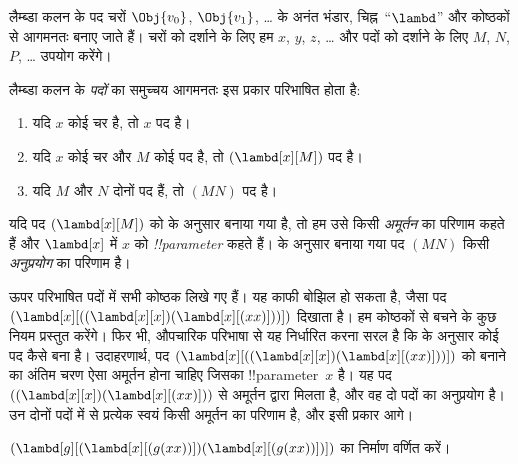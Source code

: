 \documentclass[../../../include/open-logic-section]{subfiles}
\begin{document}

लैम्ब्डा कलन के पद चरों $\Obj{v_0}$, $\Obj{v_1}$, \dots{} के अनंत भंडार,
चिह्न~``$\lambd$'' और कोष्ठकों से आगमनतः बनाए जाते हैं। चरों को दर्शाने के
लिए हम $x$, $y$, $z$, \dots{} और पदों को दर्शाने के लिए $M$, $N$, $P$,
\dots{} उपयोग करेंगे।

\begin{defn}[पद] 
लैम्ब्डा कलन के \emph{पदों} का समुच्चय आगमनतः इस प्रकार परिभाषित होता है:
\begin{enumerate}
  \item {} यदि $x$ कोई चर है, तो $x$ पद है।
  \item {} यदि $x$ कोई चर और $M$ कोई पद है, तो
    $(\lambd[x][M])$ पद है।
  \item {} यदि $M$ और $N$ दोनों पद हैं, तो $(MN)$ पद
    है।
\end{enumerate}
\end{defn}

यदि पद $(\lambd[x][M])$ को  के अनुसार बनाया गया है,
तो हम उसे किसी \emph{अमूर्तन} का परिणाम कहते हैं और $\lambd[x]$ में $x$ को
\emph{!!{parameter}} कहते हैं।  के अनुसार बनाया गया
पद $(MN)$ किसी \emph{अनुप्रयोग} का परिणाम है।

ऊपर परिभाषित पदों में सभी कोष्ठक लिखे गए हैं। यह काफी बोझिल हो सकता है,
जैसा पद $(\lambd[x][((\lambd[x][x])(\lambd[x][(xx)]))])$ दिखाता है। हम
कोष्ठकों से बचने के कुछ नियम प्रस्तुत करेंगे। फिर भी, औपचारिक परिभाषा से
यह निर्धारित करना सरल है कि  के अनुसार कोई पद कैसे बना
है। उदाहरणार्थ, पद $(\lambd[x][((\lambd[x][x])(\lambd[x][(xx)]))])$ को
बनाने का अंतिम चरण ऐसा अमूर्तन होना चाहिए जिसका !!{parameter}~$x$ है। यह
पद $((\lambd[x][x])(\lambd[x][(xx)]))$ से अमूर्तन द्वारा मिलता है, और वह
दो पदों का अनुप्रयोग है। उन दोनों पदों में से प्रत्येक स्वयं किसी अमूर्तन
का परिणाम है, और इसी प्रकार आगे।

\begin{prob}
$(\lambd[g][(\lambd[x][(g (x x))])
  (\lambd[x][(g (x x))])])$ का निर्माण वर्णित करें।
\end{prob}
\end{document}
